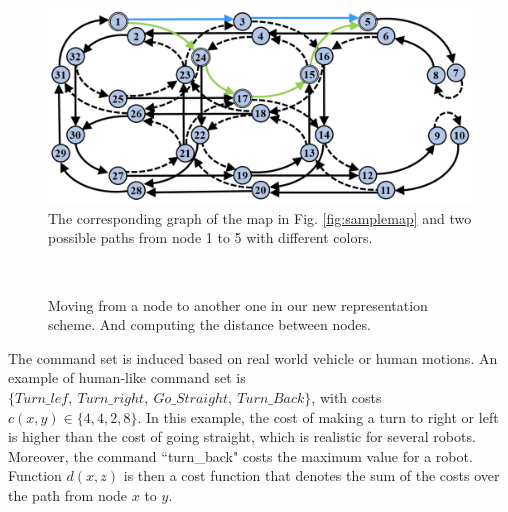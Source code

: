 \documentclass[smallcondensed]{svjour3}
\begin{document}
\begin{figure}[t]
	\centering
	\includegraphics[width=0.8\columnwidth]{Figures/Fig5.png}
	\caption{The corresponding graph of the map in Fig. \ref{fig:samplemap} and two possible paths from node 1 to 5 with different colors.}
	\label{fig:numberedGraph}
\end{figure}
%
\begin{figure}[t]
\centering
     \\
    \caption{Moving from a node to another one in our new representation scheme. And computing the distance between nodes.}
    \label{fig:samplepath}
\end{figure}

%
The command set is induced based on real world vehicle or human motions. An example of human-like command set is \sloppy $\{Turn\_lef,~ Turn\_right,~ Go\_Straight, ~Turn\_Back\}$, with costs $c(x,y) \in \{4,4,2,8\}$. In this example, the cost of making a turn to right or left is higher than the cost of going straight, which is realistic for several robots. Moreover, the command ``turn\_back" costs the maximum value for a robot. Function $d(x,z)$ is then a cost function that denotes the sum of the costs over the path from node $x$ to $y$.
\end{document}
